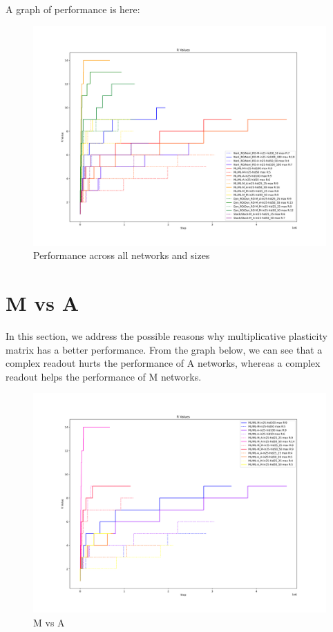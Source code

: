 \documentclass{article}
\begin{document}
A graph of performance is here:
\begin{figure}[h!]
\includegraphics[width=1\textwidth]{all_p}
\caption{Performance across all networks and sizes}
\end{figure}

\section{M vs A}
In this section, we address the possible reasons why multiplicative plasticity matrix has a better performance.
From the graph below, we can see that a complex readout hurts the performance of A networks, whereas a complex readout helps the performance of M networks. 
\begin{figure}[h!]
\includegraphics[width=1\textwidth]{MvA.png}
\caption{M vs A}
\end{figure}
\end{document}
